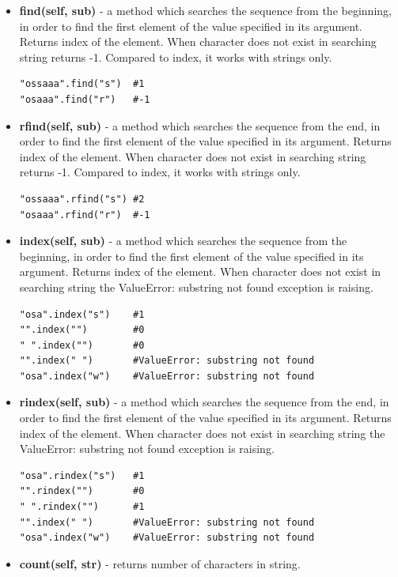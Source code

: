 \documentclass{article}
\begin{document}
\begin{itemize}
\item \textbf{find(self, sub)} - a method which searches the sequence from the beginning, in order to find the first element of the value specified in its argument. Returns index of the element. When character does not exist in searching string returns -1. Compared to index, it works with strings only.
\begin{lstlisting}[style=pystyle]
"ossaaa".find("s")	#1
"osaaa".find("r")	#-1
\end{lstlisting}

\item \textbf{rfind(self, sub)} - a method which searches the sequence from the end, in order to find the first element of the value specified in its argument. Returns index of the element. When character does not exist in searching string returns -1. Compared to index, it works with strings only.
\begin{lstlisting}[style=pystyle]
"ossaaa".rfind("s")	#2
"osaaa".rfind("r")	#-1
\end{lstlisting}

\item \textbf{index(self, sub)} - a method which searches the sequence from the beginning, in order to find the first element of the value specified in its argument. Returns index of the element. When character does not exist in searching string the \textcolor{pythonerror}{ValueError: substring not found} exception is raising.
\begin{lstlisting}[style=pystyle]
"osa".index("s")	#1
"".index("") 		#0
" ".index("") 		#0
"".index(" ") 		#ValueError: substring not found
"osa".index("w")	#ValueError: substring not found
\end{lstlisting}
\item \textbf{rindex(self, sub)} - a method which searches the sequence from the end, in order to find the first element of the value specified in its argument. Returns index of the element. When character does not exist in searching string the \textcolor{pythonerror}{ValueError: substring not found} exception is raising.
\begin{lstlisting}[style=pystyle]
"osa".rindex("s")	#1
"".rindex("")		#0
" ".rindex("")		#1
"".index(" ") 		#ValueError: substring not found
"osa".index("w")	#ValueError: substring not found
\end{lstlisting}
\item \textbf{count(self, str)} - returns number of characters in string.
\end{itemize}
\end{document}
